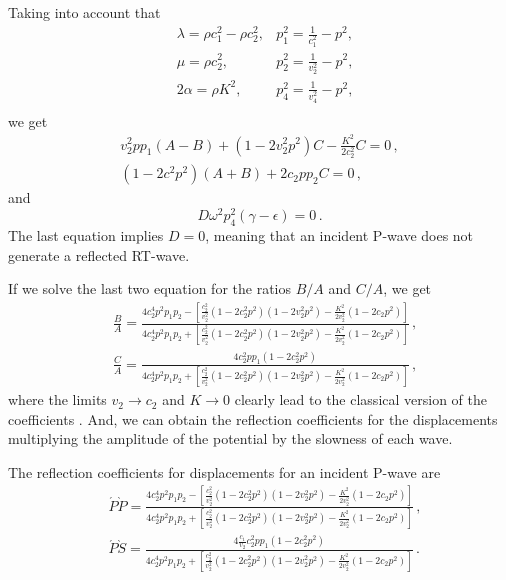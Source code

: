 \documentclass[12pt]{article}
\begin{document}
Taking into account that
\begin{align*}
&\lambda = \rho c_1^2 - \rho c_2^2, &p_1^2 = \frac{1}{c_1^2} - p^2,\\
&\mu = \rho c_2^2 , &p_2^2 = \frac{1}{v_2^2} - p^2,\\
&2\alpha = \rho K^2, &p_4^2 = \frac{1}{v_4^2} - p^2,\\
\end{align*}
we get
\begin{align*}
v_2^2 p p_1 (A - B) + (1 - 2v_2^2 p^2)C - \frac{K^2}{2c_2^2}C = 0\, ,\\
(1 - 2c^2p^2)(A + B) + 2c_2p p_2 C = 0\, ,
\end{align*}
and
\[D\omega^2 p_4^2 (\gamma - \epsilon) = 0\, .\]
The last equation implies \(D = 0\), meaning that an incident P-wave does not generate a reflected RT-wave.

If we solve the last two equation for the ratios \(B/A\) and \(C/A\), we get
\begin{align*}
&\frac{B}{A} = \frac{4c_2^4 p^2 p_1 p_2 - \left[\frac{c_2^2}{v_2^2}(1 - 2c_2^2 p^2)(1 - 2v_2^2 p^2) - \frac{K^2}{2v_2^2}(1 - 2c_2 p^2)\right]} {4c_2^4 p^2 p_1 p_2 + \left[\frac{c_2^2}{v_2^2}(1 - 2c_2^2 p^2)(1 - 2v_2^2 p^2) - \frac{K^2}{2v_2^2}(1 - 2c_2 p^2)\right]}\, ,\\
&\frac{C}{A} = \frac{4c_2^2 p p_1 (1 - 2c_2^2 p^2)} {4c_2^4 p^2 p_1 p_2 + \left[\frac{c_2^2}{v_2^2}(1 - 2c_2^2 p^2)(1 - 2v_2^2 p^2) - \frac{K^2}{2v_2^2}(1 - 2c_2 p^2)\right]}\, ,
\end{align*}
where the limits \(v_2 \rightarrow c_2\) and \(K \rightarrow 0\) clearly lead to the classical version of the coefficients \citep{AkiAndRichards2002}. And, we can obtain the reflection coefficients for the displacements multiplying the amplitude of the potential by the slowness of each wave.

The reflection coefficients for displacements for an incident P-wave are
\begin{align}
&\acute{P}\grave{P} = \frac{4c_2^4 p^2 p_1 p_2 - \left[\frac{c_2^2}{v_2^2}(1 - 2c_2^2 p^2)(1 - 2v_2^2 p^2) - \frac{K^2}{2v_2^2}(1 - 2c_2 p^2)\right]} {4c_2^4 p^2 p_1 p_2 + \left[\frac{c_2^2}{v_2^2}(1 - 2c_2^2 p^2)(1 - 2v_2^2 p^2) - \frac{K^2}{2v_2^2}(1 - 2c_2 p^2)\right]}\, ,\\
&\acute{P}\grave{S} = \frac{4\frac{c_1}{v_2}c_2^2 p p_1 (1 - 2c_2^2 p^2)} {4c_2^4 p^2 p_1 p_2 + \left[\frac{c_2^2}{v_2^2}(1 - 2c_2^2 p^2)(1 - 2v_2^2 p^2) - \frac{K^2}{2v_2^2}(1 - 2c_2 p^2)\right]}\, .
\end{align}
\end{document}
